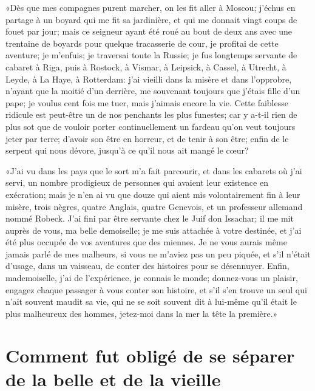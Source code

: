«Dès que mes compagnes purent marcher, on les fit aller à Moscou;
j’échus en partage à un boyard qui me fit sa jardinière, et qui me
donnait vingt coups de fouet par jour; mais ce seigneur ayant été roué
au bout de deux ans avec une trentaine de boyards pour quelque
tracasserie de cour, je profitai de cette aventure; je m’enfuis; je
traversai toute la Russie; je fus longtemps servante de cabaret à
Riga, puis à Rostock, à Vismar, à Leipsick, à Cassel, à Utrecht, à
Leyde, à La Haye, à Rotterdam: j’ai vieilli dans la misère et dans
l’opprobre, n’ayant que la moitié d’un derrière, me souvenant toujours
que j’étais fille d’un pape; je voulus cent fois me tuer, mais j’aimais
encore la vie. Cette faiblesse ridicule est peut-être un de nos
penchants les plus funestes; car y a-t-il rien de plus sot que de
vouloir porter continuellement un fardeau qu’on veut toujours jeter par
terre; d’avoir son être en horreur, et de tenir à son être; enfin de
 le serpent qui nous dévore, jusqu’à ce qu’il nous ait \linebreak mangé le
cœur?



«J’ai vu dans les pays que le sort m’a fait parcourir, et dans les
cabarets où j’ai servi, un nombre prodigieux de personnes qui avaient
leur existence en exécration; mais je n’en ai vu que douze qui aient
mis volontairement fin à leur misère, trois nègres, quatre Anglais,
quatre Genevois, et un professeur allemand nommé Robeck. J’ai fini
par être servante chez le Juif don Issachar; il me mit auprès de vous,
ma belle demoiselle; je me suis attachée à votre destinée, et j’ai été
plus occupée de vos aventures que des miennes. Je ne vous aurais même
jamais parlé de mes malheurs, si vous ne m’aviez pas un peu piquée, et
s’il n’était d’usage, dans un vaisseau, de conter des histoires pour se
désennuyer. Enfin, mademoiselle, j’ai de l’expérience, je connais le
monde; donnez-vous un plaisir, engagez chaque passager à vous conter
son histoire, et s’il s’en trouve un seul qui n’ait souvent maudit sa
vie, qui ne se soit souvent dit à lui-même qu’il était le plus
malheureux des hommes, jetez-moi dans la mer la tête la première.»




\chapter[Comment Candide fut obligé de se séparer…]{Comment  fut obligé de se séparer\\de la belle  et de la
vieille}


